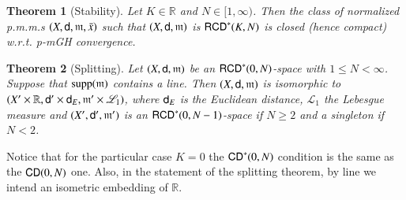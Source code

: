 \documentclass[11pt,reqno]{amsart}
\newcommand{\supp}{\mathop{\rm supp}\nolimits}
\newcommand{\mm}{\mathfrak m}
\newcommand{\sfd}{{\sf d}}
\newcommand{\LL}{\mathscr{L}}
\newcommand{\R}{\mathbb{R}}
\newcommand{\CD}{{\sf CD}}
\newcommand{\RCD}{{\sf RCD}}
\newtheorem{theorem}{Theorem}[section]
\theoremstyle{definition}
\theoremstyle{remark}
\theoremstyle{remark}
\theoremstyle{remark}
\theoremstyle{remark}
\theoremstyle{remark}
\theoremstyle{remark}
\theoremstyle{remark}
\begin{document}
\begin{theorem}[Stability]\label{thm:stab}
Let $K\in \R$ and $N\in[1,\infty)$. Then the class of normalized p.m.m.s $(X,\sfd,\mm,\bar x)$ such that $(X,\sfd,\mm)$ is $\RCD^*(K,N)$ is closed (hence compact) w.r.t. p-mGH convergence.
\end{theorem}
\begin{theorem}[Splitting]\label{thm:splitting}
 Let $(X,\sfd,\mm)$ be an $\RCD^*(0,N)$-space with $1 \le N < \infty$. Suppose that
 $\supp(\mm)$ contains a line. Then $(X,\sfd,\mm)$ is isomorphic to $(X'\times \R, \sfd'\times \sfd_E,\mm'\times \LL_1)$,
where $\sfd_E$ is the Euclidean distance, $\LL_1$ the Lebesgue measure and  $(X',\sfd',\mm')$ is an $\RCD^*(0,N-1)$-space if $N \ge 2$ and a singleton if $N < 2$.
\end{theorem}

Notice that for the particular case $K=0$ the $\CD^*(0,N)$ condition is the same as the $\CD(0,N)$ one. Also, in the statement of the splitting theorem, by line we intend an isometric embedding of $\R$.
\end{document}
